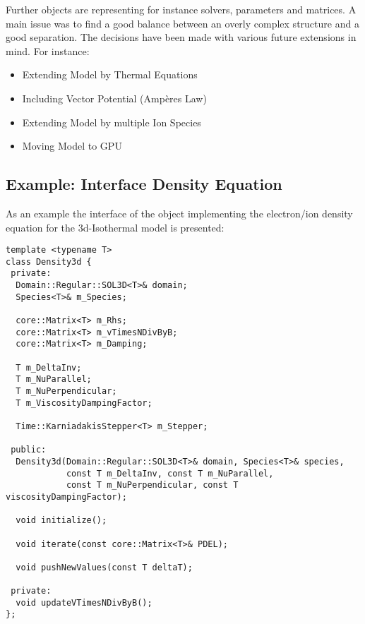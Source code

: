 \documentclass[master.tex]{subfiles}
\begin{document}
Further objects are representing for instance solvers, parameters and matrices.\newline
A main issue was to find a good balance between an overly complex structure and a good separation. The decisions have been made with various future extensions in mind. For instance:

\begin{itemize}
  \item Extending Model by Thermal Equations
  \item Including Vector Potential (Ampères Law)
  \item Extending Model by multiple Ion Species
  \item Moving Model to GPU
\end{itemize}

\subsection{Example: Interface Density Equation}
As an example the interface of the object implementing the electron/ion density equation for the 3d-Isothermal model is presented:

\begin{lstlisting}
template <typename T>
class Density3d {
 private:
  Domain::Regular::SOL3D<T>& domain;
  Species<T>& m_Species;

  core::Matrix<T> m_Rhs;
  core::Matrix<T> m_vTimesNDivByB;
  core::Matrix<T> m_Damping;

  T m_DeltaInv;
  T m_NuParallel;
  T m_NuPerpendicular;
  T m_ViscosityDampingFactor;

  Time::KarniadakisStepper<T> m_Stepper;

 public:
  Density3d(Domain::Regular::SOL3D<T>& domain, Species<T>& species,
            const T m_DeltaInv, const T m_NuParallel,
            const T m_NuPerpendicular, const T viscosityDampingFactor);

  void initialize();

  void iterate(const core::Matrix<T>& PDEL);

  void pushNewValues(const T deltaT);

 private:
  void updateVTimesNDivByB();
};
\end{lstlisting}
\end{document}

